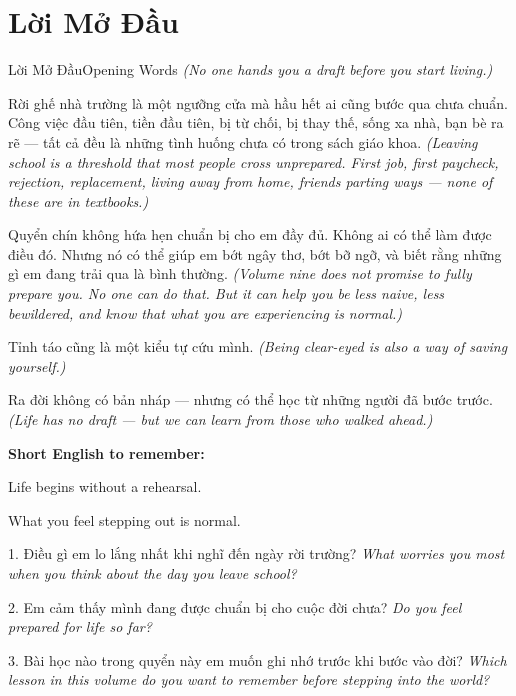 \chapter*{Lời Mở Đầu}

\begin{truyen}{Lời Mở Đầu}{Opening Words}
\textit{(No one hands you a draft before you start living.)}

Rời ghế nhà trường là một ngưỡng cửa mà hầu hết ai cũng bước qua chưa chuẩn. Công việc đầu tiên, tiền đầu tiên, bị từ chối, bị thay thế, sống xa nhà, bạn bè ra rẽ — tất cả đều là những tình huống chưa có trong sách giáo khoa.
\textit{(Leaving school is a threshold that most people cross unprepared. First job, first paycheck, rejection, replacement, living away from home, friends parting ways --- none of these are in textbooks.)}

Quyển chín không hứa hẹn chuẩn bị cho em đầy đủ. Không ai có thể làm được điều đó. Nhưng nó có thể giúp em bớt ngây thơ, bớt bỡ ngỡ, và biết rằng những gì em đang trải qua là bình thường.
\textit{(Volume nine does not promise to fully prepare you. No one can do that. But it can help you be less naive, less bewildered, and know that what you are experiencing is normal.)}

Tỉnh táo cũng là một kiểu tự cứu mình.
\textit{(Being clear-eyed is also a way of saving yourself.)}
\end{truyen}

\begin{baihoc}
Ra đời không có bản nháp --- nhưng có thể học từ những người đã bước trước.
\textit{(Life has no draft --- but we can learn from those who walked ahead.)}
\end{baihoc}

\begin{ghinhoanh}
\textbf{Short English to remember:}

Life begins without a rehearsal.

What you feel stepping out is normal.
\end{ghinhoanh}

\begin{tuhocnhanh}
1. Điều gì em lo lắng nhất khi nghĩ đến ngày rời trường? \textit{What worries you most when you think about the day you leave school?}

2. Em cảm thấy mình đang được chuẩn bị cho cuộc đời chưa? \textit{Do you feel prepared for life so far?}

3. Bài học nào trong quyển này em muốn ghi nhớ trước khi bước vào đời? \textit{Which lesson in this volume do you want to remember before stepping into the world?}
\end{tuhocnhanh}

\ngancach
